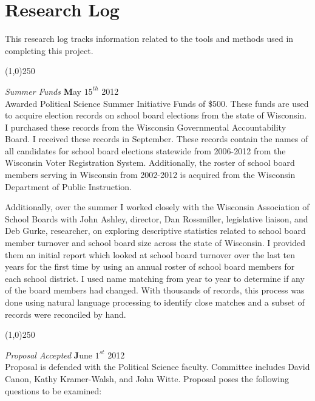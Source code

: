 \chapter{Research Log}
\label{app:log}

This research log tracks information related to the tools and methods used in 
completing this project. 

\begin{center}
\line(1,0){250}
\end{center}

{\em Summer Funds} \hfill {\textbf May $15^{th}$ 2012}\\

Awarded Political Science Summer Initiative Funds of \$500. These funds are used to acquire 
election records on school board elections from the state of Wisconsin. I purchased 
these records from the Wisconsin Governmental Accountability Board. I received these 
records in September. These records contain the names of all candidates for school 
board elections statewide from 2006-2012 from the Wisconsin Voter Registration System. 
Additionally, the roster of school board members serving in Wisconsin from 2002-2012 
is acquired from the Wisconsin Department of Public Instruction. 

Additionally, over the summer I worked closely with the Wisconsin Association of 
School Boards with John Ashley, director, Dan Rossmiller, legislative liaison, 
and Deb Gurke, researcher, on exploring descriptive statistics related to school 
board member turnover and school board size across the state of Wisconsin. I 
provided them an initial report which looked at school board turnover over the 
last ten years for the first time by using an annual roster of school board 
members for each school district. I used name matching from year to year to 
determine if any of the board members had changed. With thousands of records, this 
process was done using natural language processing to identify close matches and 
a subset of records were reconciled by hand. 

\begin{center}
\line(1,0){250}
\end{center}

{\em Proposal Accepted} \hfill {\textbf June $1^{st}$ 2012}\\
Proposal is defended with the Political Science faculty. Committee includes David Canon,
Kathy Kramer-Walsh, and John Witte. Proposal poses the following questions to be examined: 

